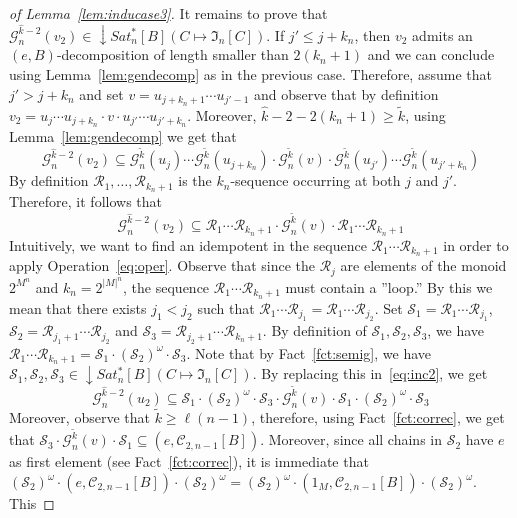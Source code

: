 \documentclass[envcountsame]{llncs}
\newcommand\Cs{\ensuremath{\mathcal{C}}\xspace}
\newcommand\Cstwolen[1]{\ensuremath{\Cs_{2,#1}}\xspace}
\newcommand\Gs{\ensuremath{\mathcal{G}}\xspace}
\newcommand\Ss{\ensuremath{\mathcal{S}}\xspace}
\newcommand\Rs{\ensuremath{\mathcal{R}}\xspace}
\newcommand\lmo{\ensuremath{\leqslant}\xspace}
\let\geq\geqslant
\newcommand\chains{chains\xspace}
\newcommand\fI{\ensuremath{\mathfrak I}\xspace}
\DeclareMathOperator{\downclos}{\downarrow}
\begin{document}
\begin{proof}[of Lemma~\ref{lem:inducase3}]
  \medskip
  It remains to prove that $\Gs_n^{\widehat{k}-2}(v_2) \in \downclos
  Sat^{*}_n[B](C \mapsto \fI_n[C])$. If $j' \lmo j + k_n$, then $v_2$
  admits an $(e,B)$-decomposition of length smaller than $2(k_n+1)$ and
  we can conclude using Lemma~\ref{lem:gendecomp} as in the previous
  case. Therefore, assume that $j' > j + k_n$ and set $v = u_{j+k_n+1}
  \cdots u_{j'-1}$ and observe that by definition $v_2 = u_j \cdots
  u_{j+k_n} \cdot v \cdot u_{j'} \cdots u_{j'+k_n}$. Moreover,
  $\widehat{k} -2 - 2(k_n+1) \geq \widetilde{k}$, using
  Lemma~\ref{lem:gendecomp} we get that  
  \[
  \Gs_n^{\widehat{k}-2}(v_2) \subseteq \Gs_n^{\widetilde{k}}(u_j) \cdots
  \Gs_n^{\widetilde{k}}(u_{j+k_n}) \cdot \Gs_n^{\widetilde{k}}(v) \cdot
  \Gs_n^{\widetilde{k}}(u_{j'}) \cdots \Gs_n^{\widetilde{k}}(u_{j'+k_n})
  \]
  By definition $\Rs_1,\dots,\Rs_{k_n+1}$ is the $k_n$-sequence occurring
  at both $j$ and $j'$. Therefore, it follows that 
  \begin{equation}
    \Gs_n^{\widehat{k}-2}(v_2) \subseteq \Rs_1 \cdots \Rs_{k_n+1} \cdot
    \Gs_n^{\widetilde{k}}(v) \cdot \Rs_1 \cdots \Rs_{k_n+1} \label{eq:inc2}
  \end{equation}
  Intuitively, we want to find an idempotent in the sequence $\Rs_1
  \cdots \Rs_{k_n+1}$ in order to apply
  Operation~\eqref{eq:oper}. Observe that since the $\Rs_j$ are elements
  of the monoid $2^{M^n}$ and $k_n = 2^{|M|^n}$, the sequence $\Rs_1 \cdots
  \Rs_{k_n+1}$ must contain a ''loop.'' By this we mean that there
  exists $j_1 < j_2$ such that $\Rs_{1} \cdots \Rs_{j_1} = \Rs_1 \cdots
  \Rs_{j_2}$. Set $\Ss_1 = \Rs_{1} \cdots \Rs_{j_1}$, $\Ss_2 = \Rs_{j_1
    + 1} \cdots \Rs_{j_2}$ and $\Ss_3 = \Rs_{j_2 + 1} \cdots
  \Rs_{k_n+1}$. By definition of $\Ss_1,\Ss_2,\Ss_3$, we have $\Rs_1
  \cdots \Rs_{k_n+1} = \Ss_1 \cdot (\Ss_2)^\omega \cdot
  \Ss_3$. Note that by Fact~\ref{fct:semig}, we have $\Ss_1,\Ss_2,\Ss_3
  \in \downclos Sat^{*}_n[B](C \mapsto \fI_n[C])$. By replacing this
  in~\eqref{eq:inc2}, we get
  \[
  \Gs_n^{\widehat{k}-2}(u_2) \subseteq \Ss_1 \cdot
  (\Ss_2)^\omega \cdot \Ss_3 \cdot \Gs_n^{\tilde{k}}(v) \cdot \Ss_1 \cdot
  (\Ss_2)^\omega \cdot \Ss_3
  \]
  Moreover, observe that $\tilde{k} \geq \ell(n-1)$, therefore, using
  Fact~\ref{fct:correc}, we get that $\Ss_3 \cdot
  \Gs_n^{\tilde{k}}(v) \cdot \Ss_1 \subseteq
  (e,\Cstwolen{n-1}[B])$. Moreover, since all \chains in $\Ss_2$ have $e$
  as first element (see Fact~\ref{fct:correc}), it is immediate that
  $(\Ss_2)^\omega \cdot (e,\Cstwolen{n-1}[B]) \cdot (\Ss_2)^\omega =
  (\Ss_2)^\omega \cdot (1_M,\Cstwolen{n-1}[B]) \cdot (\Ss_2)^\omega$. This

\end{proof}
\end{document}
